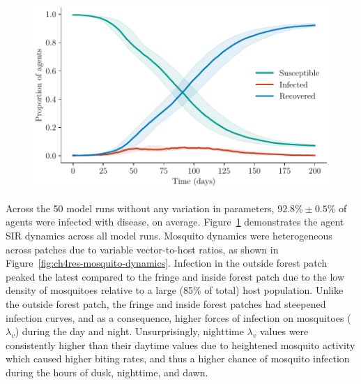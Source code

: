 \begin{figure}[htb!]
     \centering
     \includegraphics[width=.9\textwidth]{figures/ch4/no_itn_disease_dynamics.pdf}
    \label{fig:ch4res-overall}
\end{figure}


\setcounter{savefootnote}{\value{footnote}}%
\addtocounter{footnote}{-1}%

\setcounter{footnote}{\value{savefootnote}}%

Across the 50 model runs without any variation in parameters, $92.8\% \pm 0.5\%$ of agents were infected with disease, on average. Figure~\ref{fig:ch4res-overall} demonstrates the agent SIR dynamics across all model runs. Mosquito dynamics were heterogeneous across patches due to variable vector-to-host ratios, as shown in Figure~\ref{fig:ch4res-mosquito-dynamics}. Infection in the outside forest patch peaked the latest compared to the fringe and inside forest patch due to the low density of mosquitoes relative to a large (85\% of total) host population. Unlike the outside forest patch, the fringe and inside forest patches had steepened infection curves, and as a consequence, higher forces of infection on mosquitoes ($\lambda_v$) during the day and night. Unsurprisingly, nighttime $\lambda_v$ values were consistently higher than their daytime values due to heightened mosquito activity which caused higher biting rates, and thus a higher chance of mosquito infection during the hours of dusk, nighttime, and dawn.

